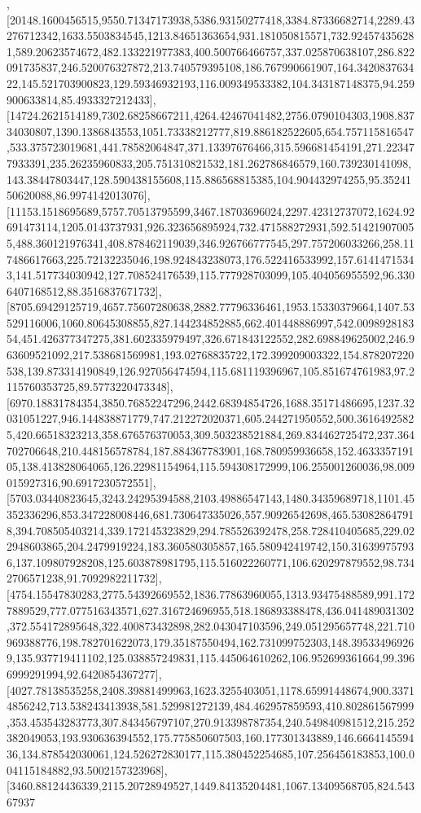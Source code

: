 \documentclass{article}
\begin{document}
,[20148.1600456515,9550.71347173938,5386.93150277418,3384.87336682714,2289.43276712342,1633.5503834545,1213.84651363654,931.181050815571,732.924574356281,589.20623574672,482.133221977383,400.500766466757,337.025870638107,286.822091735837,246.520076327872,213.740579395108,186.767990661907,164.342083763422,145.521703900823,129.59346932193,116.009349533382,104.343187148375,94.259900633814,85.4933327212433],[14724.2621514189,7302.68258667211,4264.42467041482,2756.0790104303,1908.83734030807,1390.1386843553,1051.73338212777,819.886182522605,654.757115816547,533.375723019681,441.78582064847,371.13397676466,315.596681454191,271.223477933391,235.26235960833,205.751310821532,181.262786846579,160.739230141098,143.38447803447,128.590438155608,115.886568815385,104.904432974255,95.3524150620088,86.9974142013076],[11153.1518695689,5757.70513795599,3467.18703696024,2297.42312737072,1624.92691473114,1205.0143737931,926.323656895924,732.471588272931,592.514219070055,488.360121976341,408.878462119039,346.926766777545,297.757206033266,258.117486617663,225.72132235046,198.924843238073,176.522416533992,157.61414715343,141.517734030942,127.708524176539,115.777928703099,105.404056955592,96.3306407168512,88.3516837671732],[8705.69429125719,4657.75607280638,2882.77796336461,1953.15330379664,1407.53529116006,1060.80645308855,827.144234852885,662.401448886997,542.009892818354,451.426377347275,381.602335979497,326.671843122552,282.698849625002,246.963609521092,217.538681569981,193.02768835722,172.399209003322,154.878207220538,139.873314190849,126.927056474594,115.681119396967,105.851674761983,97.2115760353725,89.5773220473348],[6970.18831784354,3850.76852247296,2442.68394854726,1688.35171486695,1237.32031051227,946.144838871779,747.212272020371,605.244271950552,500.36164925825,420.66518323213,358.676576370053,309.503238521884,269.834462725472,237.364702706648,210.448156578784,187.884367783901,168.780959936658,152.463335719105,138.413828064065,126.22981154964,115.594308172999,106.255001260036,98.009015927316,90.6917230572551],[5703.03440823645,3243.24295394588,2103.49886547143,1480.34359689718,1101.45352336296,853.347228008446,681.730647335026,557.90926542698,465.530828647918,394.708505403214,339.172145323829,294.785526392478,258.728410405685,229.022948603865,204.2479919224,183.360580305857,165.580942419742,150.316399757936,137.109807928208,125.603878981795,115.516022260771,106.620297879552,98.7342706571238,91.7092982211732],[4754.15547830283,2775.54392669552,1836.77863960055,1313.93475488589,991.1727889529,777.077516343571,627.316724696955,518.186893388478,436.041489031302,372.554172895648,322.400873432898,282.043047103596,249.051295657748,221.710969388776,198.782701622073,179.35187550494,162.731099752303,148.395334969269,135.937719411102,125.038857249831,115.445064610262,106.952699361664,99.3966999291994,92.6420854367277],[4027.78138535258,2408.39881499963,1623.3255403051,1178.65991448674,900.33714856242,713.538243413938,581.529981272139,484.462957859593,410.802861567999,353.453543283773,307.843456797107,270.913398787354,240.549840981512,215.252382049053,193.930636394552,175.775850607503,160.177301343889,146.666414559436,134.878542030061,124.526272830177,115.380452254685,107.256456183853,100.004115184882,93.5002157323968],[3460.88124436339,2115.20728949527,1449.84135204481,1067.13409568705,824.54367937
\end{document}
